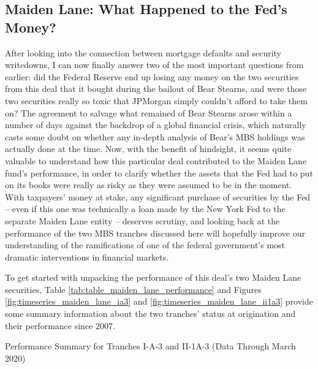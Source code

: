 \documentclass[12pt]{article}
\begin{document}
\subsection*{Maiden Lane: What Happened to the Fed's Money?}

After looking into the connection between mortgage defaults and security writedowns, I can now finally answer two of the most important questions from earlier: did the Federal Reserve end up losing any money on the two securities from this deal that it bought during the bailout of Bear Stearns, and were those two securities really so toxic that JPMorgan simply couldn’t afford to take them on? The agreement to salvage what remained of Bear Stearns arose within a number of days against the backdrop of a global financial crisis, which naturally casts some doubt on whether any in-depth analysis of Bear’s MBS holdings was actually done at the time. Now, with the benefit of hindsight, it seems quite valuable to understand how this particular deal contributed to the Maiden Lane fund’s performance, in order to clarify whether the assets that the Fed had to put on its books were really as risky as they were assumed to be in the moment. With taxpayers’ money at stake, any significant purchase of securities by the Fed – even if this one was technically a loan made by the New York Fed to the separate Maiden Lane entity – deserves scrutiny, and looking back at the performance of the two MBS tranches discussed here will hopefully improve our understanding of the ramifications of one of the federal government’s most dramatic interventions in financial markets.

	To get started with unpacking the performance of this deal's two Maiden Lane securities, Table \ref{tab:table_maiden_lane_performance} and Figures \ref{fig:timeseries_maiden_lane_ia3} and \ref{fig:timeseries_maiden_lane_ii1a3} provide some summary information about the two tranches’ status at origination and their performance since 2007.

\begin{table}[H]
	\centering
	
	\caption{Performance Summary for Tranches I-A-3 and II-1A-3 (Data Through March 2020)}
	\label{tab:table_maiden_lane_performance}
\end{table}
\end{document}
